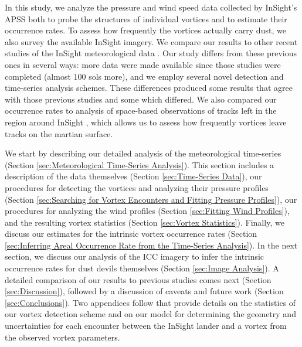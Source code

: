 \documentclass{aastex63}
\begin{document}
In this study, we analyze the pressure and wind speed data collected by InSight's APSS both to probe the structures of individual vortices and to estimate their occurrence rates. To assess how frequently the vortices actually carry dust, we also survey the available InSight imagery. We compare our results to other recent studies of the InSight meteorological data \citep{2021Icar..35514119L, Spiga2021}. Our study differs from these previous ones in several ways: more data were made available since those studies were completed (almost 100 sols more), and we employ several novel detection and time-series analysis schemes. These differences produced some results that agree with those previous studies and some which differed. We also compared our occurrence rates to analysis of space-based observations of tracks left in the region around InSight \citep{2016Icar..266..315R, 2020GeoRL..4787234P}, which allows us to assess how frequently vortices leave tracks on the martian surface. 

We start by describing our detailed analysis of the meteorological time-series (Section \ref{sec:Meteorological Time-Series Analysis}). This section includes a description of the data themselves (Section \ref{sec:Time-Series Data}), our procedures for detecting the vortices and analyzing their pressure profiles (Section \ref{sec:Searching for Vortex Encounters and Fitting Pressure Profiles}), our procedures for analyzing the wind profiles (Section \ref{sec:Fitting Wind Profiles}), and the resulting vortex statistics (Section \ref{sec:Vortex Statistics}). Finally, we discuss our estimates for the intrinsic vortex occurrence rates (Section \ref{sec:Inferring Areal Occurrence Rate from the Time-Series Analysis}). In the next section, we discuss our analysis of the ICC imagery to infer the intrinsic occurrence rates for dust devils themselves (Section \ref{sec:Image Analysis}). A detailed comparison of our results to previous studies comes next (Section \ref{sec:Discussion}), followed by a discussion of caveats and future work (Section \ref{sec:Conclusions}). Two appendices follow that provide details on the statistics of our vortex detection scheme and on our model for determining the geometry and uncertainties for each encounter between the InSight lander and a vortex from the observed vortex parameters. 
\end{document}
